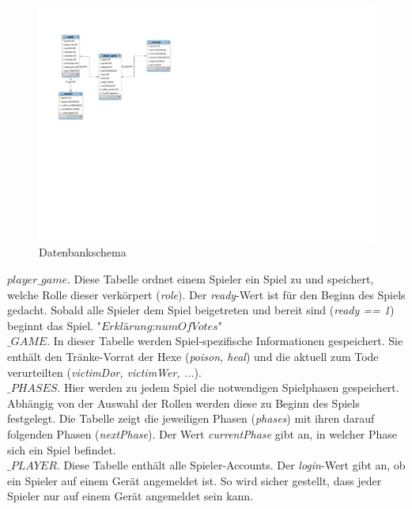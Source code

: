 \documentclass[12pt]{article}
\begin{document}
\begin{figure}[] 
  \centering
     \includegraphics[height = 9 cm, width = 12cm]{DB_Schema}
  \caption{Datenbankschema}
\end{figure}
	

\textbf{$player\_game.$}
Diese Tabelle ordnet einem Spieler ein Spiel zu und speichert, welche Rolle dieser verkörpert (\textit{role}). Der \textit{ready}-Wert ist für den Beginn des Spiels gedacht. Sobald alle Spieler dem Spiel beigetreten und bereit sind (\textit{ready == 1}) beginnt das Spiel. $ \textit{"Erklärung:numOfVotes"} $
\\

\textbf{$\_GAME.$}
In dieser Tabelle werden Spiel-spezifische Informationen gespeichert. Sie enthält den Tränke-Vorrat der Hexe (\textit{poison, heal}) und die aktuell zum Tode verurteilten (\textit{victimDor, victimWer, ...}).
\\

\textbf{$\_PHASES.$}
Hier werden zu jedem Spiel die notwendigen Spielphasen gespeichert. Abhängig von der Auswahl der Rollen werden diese zu Beginn des Spiels festgelegt. Die Tabelle zeigt die jeweiligen Phasen (\textit{phases}) mit ihren darauf folgenden Phasen (\textit{nextPhase}). Der Wert \textit{currentPhase} gibt an, in welcher Phase sich ein Spiel befindet.
\\

\textbf{$\_PLAYER.$}
Diese Tabelle enthält alle Spieler-Accounts. Der \textit{login}-Wert gibt an, ob ein Spieler auf einem Gerät angemeldet ist. So wird sicher gestellt, dass jeder Spieler nur auf einem Gerät angemeldet sein kann.  
\end{document}
